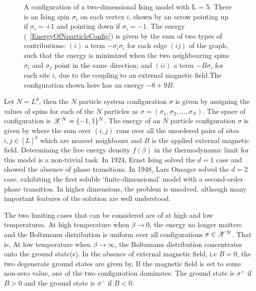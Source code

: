 \documentclass[letterpaper,english,10pt]{article}
\begin{document}
\begin{figure}
\centering

\caption{A configuration of a two-dimensional Ising model with L = 5. There is an Ising spin $\sigma_i$ on each vertex $i$, shown by an arrow pointing up if $\sigma_i = +1$ and pointing down if $\sigma_i = −1$.
The energy (~\ref{EnergyOfNparticleConfig})  is given by the sum of two types of contributions: $(i)$ a term $-\sigma_i\sigma_i$ for each edge $(ij)$ of the graph, such that the energy is minimized when the two neighbouring spins $\sigma_i$ and $\sigma_j$ point in the same direction; and $(ii)$ a term $−B\sigma_i$ for each site $i$, due to the coupling to an external magnetic field.The configuration shown here has an energy $−8 + 9B$.}
\label{figure:IsingSpins}
\end{figure}

Let $N = L^d$, then the $N$ particle system configuration $\sigma$ is given by assigning the values of spins  for each of the $N$ particles as $\sigma = (\sigma_1, \sigma_2, \dots, \sigma_N)$. 
The space of configuration is $\mathscr{X}^N = \{-1,1\}^N$. 
The energy of an $N$ particle configuration $\sigma$ is given by
where the sum over $(i,j)$ runs over all the unordered pairs of sites $i,j \in [L]^d$ which are nearest neighbours and $B$ is the applied external magnetic field. 
Determining the free energy density $f(\beta)$ in the thermodynamic limit for this model is a non-trivial task. In 1924, Ernst Ising solved the $d=1$ case and showed the absence of phase transitions. 
In 1948, Lars Onsager solved the $d=2$ case, exhibiting the first soluble `finite-dimensional' model with a second-order phase transition. 
In higher dimensions, the problem is unsolved, although many important features of the solution are well understood.

The two limiting cases that can be considered are of at high and low temperatures. 
At high temperature when $\beta \to 0$, the energy no longer matters and the Boltzmann distribution is uniform over all configurations $\sigma \in \mathscr{X}^N$. 
That is, 
At low temperature when $\beta \to \infty$, 
the Boltzmann distribution concentrates onto the ground state(s). 
In the absence of external magnetic field, i.e $B=0$, the two degenerate ground states are given by,
If the magnetic field is set to some non-zero value, one of the two configuration dominates. 
The ground state is $\sigma^+$ if $B>0$ and the ground state is $\sigma^-$ if $B<0$.
\end{document}

